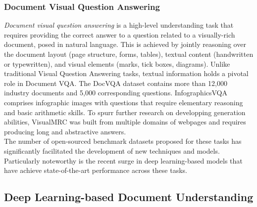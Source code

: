 \subsubsection{Document Visual Question Answering}


\textit{Document visual question answering} is a high-level understanding task that requires providing the correct answer to a question related to a visually-rich document, posed in natural language. This is achieved by jointly reasoning over the document layout (page structure, forms, tables), textual content (handwritten or typewritten), and visual elements (marks, tick boxes, diagrams). Unlike traditional Visual Question Answering tasks, textual information holds a pivotal role in \ac{Document VQA}. The DocVQA dataset \citep{mathew2021docvqa} contains more than 12,000 industry documents and 5,000 corresponding questions. InfographicsVQA \citep{mathew2022infographicvqa} comprises infographic images with questions that require elementary reasoning and basic arithmetic skills. To spurr further research on developping generation abilities, VisualMRC \citep{tanaka2021visualmrc} was built from multiple domains of webpages and requires producing long and abstractive answers. \\



The number of open-sourced benchmark datasets proposed for these tasks has significantly facilitated the development of new techniques and models. Particularly noteworthy is the recent surge in deep learning-based models that have achieve state-of-the-art performance across these tasks.

\subsection{Deep Learning-based Document Understanding}

